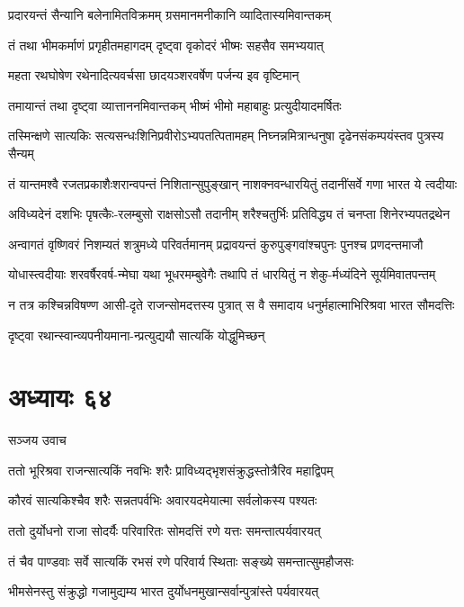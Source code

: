 \twolineshloka
{प्रदारयन्तं सैन्यानि बलेनामितविक्रमम्}
{ग्रसमानमनीकानि व्यादितास्यमिवान्तकम्}


\twolineshloka
{तं तथा भीमकर्माणं प्रगृहीतमहागदम्}
{दृष्ट्वा वृकोदरं भीष्मः सहसैव समभ्ययात्}


\twolineshloka
{महता रथघोषेण रथेनादित्यवर्चसा}
{छादयञ्शरवर्षेण पर्जन्य इव वृष्टिमान्}


\twolineshloka
{तमायान्तं तथा दृष्ट्वा व्यात्ताननमिवान्तकम्}
{भीष्मं भीमो महाबाहुः प्रत्युदीयादमर्षितः}


\twolineshloka
{तस्मिन्क्षणे सात्यकिः सत्यसन्धःशिनिप्रवीरोऽभ्यपतत्पितामहम्}
{निघ्नन्नमित्रान्धनुषा दृढेनसंकम्पयंस्तव पुत्रस्य सैन्यम्}


\twolineshloka
{तं यान्तमश्वै रजतप्रकाशैःशरान्वपन्तं निशितान्सुपुङ्खान्}
{नाशक्नवन्धारयितुं तदानींसर्वे गणा भारत ये त्वदीयाः}


\twolineshloka
{अविध्यदेनं दशभिः पृषत्कैः-रलम्बुसो राक्षसोऽसौ तदानीम्}
{शरैश्चतुर्भिः प्रतिविद्ध्य तं चनप्ता शिनेरभ्यपतद्रथेन}


\twolineshloka
{अन्वागतं वृष्णिवरं निशम्यतं शत्रुमध्ये परिवर्तमानम्}
{प्रद्रावयन्तं कुरुपुङ्गवांश्चपुनः पुनश्च प्रणदन्तमाजौ}


\twolineshloka
{योधास्त्वदीयाः शरवर्षैरवर्ष-न्मेघा यथा भूधरमम्बुवेगैः}
{तथापि तं धारयितुं न शेकु-र्मध्यंदिने सूर्यमिवातपन्तम्}


\twolineshloka
{न तत्र कश्चिन्नविषण्ण आसी-दृते राजन्सोमदत्तस्य पुत्रात्}
{स वै समादाय धनुर्महात्माभिरिश्रवा भारत सौमदत्तिः}


दृष्ट्वा रथान्स्वान्व्यपनीयमाना-न्प्रत्युद्ययौ सात्यकिं योद्धुमिच्छन्
\chapter{अध्यायः ६४}
\twolineshloka
{सञ्जय उवाच}
{}


\twolineshloka
{ततो भूरिश्रवा राजन्सात्यकिं नवभिः शरैः}
{प्राविध्यद्भृशसंक्रुद्धस्तोत्रैरिव महाद्विपम्}


\twolineshloka
{कौरवं सात्यकिश्चैव शरैः सन्नतपर्वभिः}
{अवारयदमेयात्मा सर्वलोकस्य पश्यतः}


\twolineshloka
{ततो दुर्योधनो राजा सोदर्यैः परिवारितः}
{सोमदत्तिं रणे यत्तः समन्तात्पर्यवारयत्}


\twolineshloka
{तं चैव पाण्डवाः सर्वे सात्यकिं रभसं रणे}
{परिवार्य स्थिताः सङ्ख्ये समन्तात्सुमहौजसः}


\twolineshloka
{भीमसेनस्तु संक्रुद्धो गजामुद्यम्य भारत}
{दुर्योधनमुखान्सर्वान्पुत्रांस्ते पर्यवारयत्}


